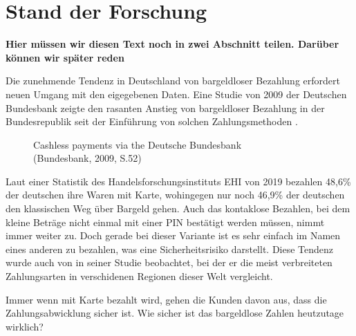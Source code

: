 \section{Stand der Forschung}

\textbf{Hier müssen wir diesen Text noch in zwei Abschnitt teilen. Darüber können wir später reden}


Die zunehmende Tendenz in Deutschland von bargeldloser Bezahlung erfordert neuen Umgang mit den 
eigegebenen Daten. Eine Studie von 2009 der Deutschen Bundesbank zeigte den rasanten Anstieg von 
bargeldloser Bezahlung in der Bundesrepublik seit der Einführung von solchen Zahlungsmethoden 
\cite{refrep:DBCP}.

\begin{figure}[htb]
    \caption{Cashless payments via the Deutsche Bundesbank\\ (Bundesbank, 2009, S.52)}
    \label{fig:refrep_DB}
\end{figure}


Laut einer Statistik des Handelsforschungsinstituts EHI von 2019 \cite{refart:KSDL} bezahlen 48,6\% 
der deutschen ihre Waren mit Karte, wohingegen nur noch 46,9\% der deutschen den klassischen 
Weg über Bargeld gehen. Auch das kontaklose Bezahlen, bei dem kleine Beträge nicht einmal mit einer 
PIN bestätigt werden müssen, nimmt immer weiter zu. Doch gerade bei dieser Variante ist es sehr einfach
im Namen eines anderen zu bezahlen, was eine Sicherheitsrisiko darstellt. Diese Tendenz wurde auch
von \cite{refart:TDMP} in seiner Studie beobachtet, bei der er die meist verbreiteten Zahlungsarten
in verschidenen Regionen dieser Welt vergleicht. 


Immer wenn mit Karte bezahlt wird, gehen die Kunden davon aus, dass die Zahlungsabwicklung sicher ist. 
Wie sicher ist das bargeldlose Zahlen heutzutage wirklich? 


